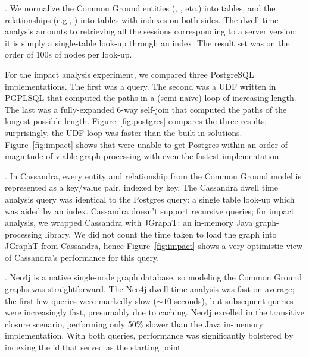 \documentclass{sig-alternate}
\begin{document}
. We normalize the Common Ground entities 
(\thing, \version, etc.) into tables, and the relationships
(e.g., ) into tables with indexes on both sides. 
The dwell time analysis amounts to retrieving all the sessions corresponding to a server version; it is simply a single-table look-up through an index. The result set was on the order of 100s of nodes per look-up.

For the impact analysis experiment, we compared three PostgreSQL implementations. The first was a  query. 
The second was a UDF written in PGPLSQL that computed the paths in a (semi-naïve) loop of increasing length. 
The last was a fully-expanded 6-way self-join that computed the paths of the longest possible length. Figure~\ref{fig:postgres} compares the three results; surprisingly, the UDF loop was faster than the built-in solutions. Figure~\ref{fig:impact} shows that were unable to get Postgres within an order of magnitude of viable graph processing with even the fastest implementation.

. In Cassandra, every entity and relationship from the Common Ground model is represented as a key/value pair, indexed by key. 
The Cassandra dwell time analysis query was identical to the Postgres query: a single table look-up which was aided by an index.
Cassandra doesn't support recursive queries; for impact analysis, we wrapped Cassandra with JGraphT: an in-memory Java graph-processing library. We did not count the time taken to load the graph into JGraphT from Cassandra, hence Figure~\ref{fig:impact} shows a very optimistic view of Cassandra's performance for this query.

. Neo4j is a native single-node graph database, so modeling the Common Ground graphs was straightforward.
The Neo4j dwell time analysis was fast on average; the first few queries were markedly slow
($\sim 10$ seconds),
but subsequent queries were increasingly fast, presumably due to caching. 
Neo4j excelled in the transitive closure scenario, performing only 50\% slower than the Java in-memory implementation.
With both queries, performance was significantly bolstered by indexing the  id that served as the starting point.
\end{document}
